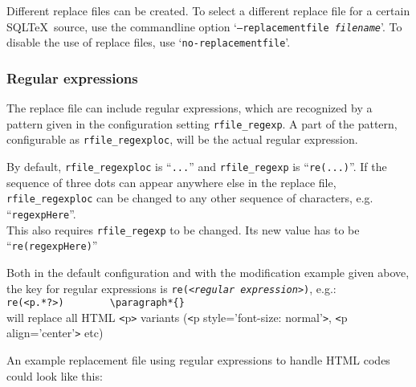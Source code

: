 \documentclass{article}
\newcommand{\vs}{\vspace{3mm}}
\begin{document}
Different replace files can be created. To select a different replace file for a certain SQL\TeX\ source, use the commandline option
`\texttt{--replacementfile \textit{filename}}'. To disable the use of replace files, use `\texttt{no-replacementfile}'.

\subsubsection{Regular expressions}\label{regexp}

The replace file can include regular expressions, which are recognized by a pattern given in the configuration setting \texttt{rfile\_regexp}. A part of the pattern, configurable as \texttt{rfile\_regexploc}, will be the actual regular expression.

\vs

By default, \texttt{rfile\_regexploc} is ``\texttt{...}'' and \texttt{rfile\_regexp} is ``\texttt{re(...)}''. If the sequence of three dots can appear anywhere else in the replace file, \texttt{rfile\_regexploc} can be changed to any other sequence of characters, e.g. ``\texttt{regexpHere}''.\\
This also requires \texttt{rfile\_regexp} to be changed. Its new value has to be ``\texttt{re(regexpHere)}''
 
\vs

Both in the default configuration and with the modification example given above, the key for regular expressions is \texttt{re(<\textit{regular expression}>)}, e.g.:\\
\hspace{3mm}\verb+re(<p.*?>)		\paragraph*{}+ \\
will replace all HTML \texttt{<}p\texttt{>} variants (\texttt{<}p style='font-size: normal'\texttt{>}, \texttt{<}p align='center'\texttt{>} etc)

\vs

An example replacement file using regular expressions to handle HTML codes could look like this:
\end{document}
